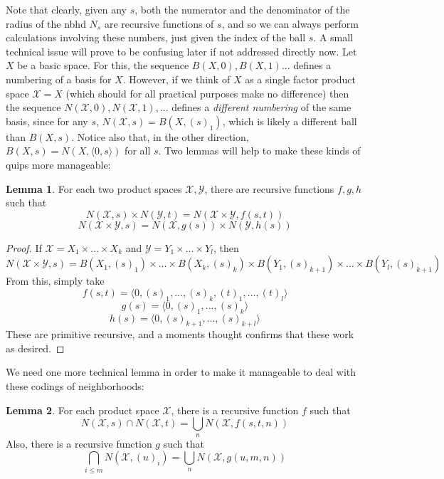 \documentclass{article}
\theoremstyle{definition}
\newtheorem{lemma}{Lemma}[section]
\theoremstyle{plain}
\begin{document}
Note that clearly, given any $s$, both the numerator and the denominator of the radius of the nbhd $N_s$ are recursive functions of $s$, and so we can always perform calculations involving these numbers, just given the index of the ball $s$.
A small technical issue will prove to be confusing later if not addressed directly now. Let $X$ be a basic space. For this, the sequence $B(X,0),B(X,1)...$ defines a numbering of a basis for $X$. However, if we think of $X$ as a single factor product space $\mathcal{X} = X$ (which should for all practical purposes make no difference) then the sequence $N(\mathcal{X},0),N(\mathcal{X},1),...$ defines a \textit{different numbering} of the same basis, since for any $s$, $N(\mathcal{X},s) = B(X,(s)_1)$, which is likely a different ball than $B(X,s)$. Notice also that, in the other direction, $B(X,s) = N(X,\langle 0,s \rangle)$ for all $s$. Two lemmas will help to make these kinds of quips more manageable:
\begin{lemma}
	For each two product spaces $\mathcal{X},\mathcal{Y}$, there are recursive functions $f,g,h$ such that 
	\[ N(\mathcal{X},s) \times N(\mathcal{Y},t) = N(\mathcal{X} \times \mathcal{Y}, f(s,t)) \]
	\[ N(\mathcal{X} \times \mathcal{Y},s) = N(\mathcal{X},g(s)) \times N(\mathcal{Y},h(s)) \]
\end{lemma}
\begin{proof}
	If $\mathcal{X} = X_1 \times \ldots \times X_k$ and $\mathcal{Y} = Y_1 \times \ldots \times Y_l$, then 
	\[ N(\mathcal{X} \times \mathcal{Y},s) = B(X_1,(s)_1) \times \ldots \times B(X_k,(s)_k) \times B(Y_1,(s)_{k+1}) \times \ldots \times B(Y_l,(s)_{k+1}) \]
	From this, simply take
	\[ f(s,t) = \langle 0,(s)_1,...,(s)_k,(t)_1,...,(t)_l \rangle \]
	\[ g(s) = \langle 0,(s)_1,...,(s)_k \rangle \]
	\[ h(s) = \langle 0,(s)_{k+1},...,(s)_{k+l} \rangle \] 
	These are primitive recursive, and a moments thought confirms that these work as desired.
\end{proof}
We need one more technical lemma in order to make it manageable to deal with these codings of neighborhoods:
\begin{lemma}
	For each product space $\mathcal{X}$, there is a recursive function $f$ such that 
	\[ N(\mathcal{X},s) \cap N(\mathcal{X},t) = \bigcup_n N(\mathcal{X},f(s,t,n)) \]
	Also, there is a recursive function $g$ such that
	\[ \bigcap_{i \leq m} N(\mathcal{X},(u)_i) = \bigcup_n N(\mathcal{X},g(u,m,n)) \]
\end{lemma}
\end{document}
